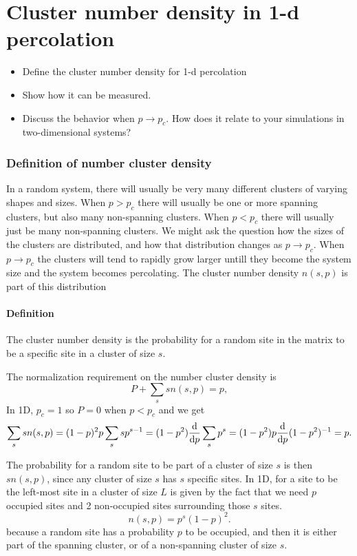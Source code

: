 \documentclass[a4paper, 11pt, notitlepage, english]{article}
\renewcommand{\d}{{\rm d}}
\begin{document}
\clearpage


\section{ Cluster number density in 1-d percolation}
\begin{itemize}
	\item Define the cluster number density for 1-d percolation
	\item Show how it can be measured.
	\item Discuss the behavior when $p \to p_c$. How does it relate to your simulations in two-dimensional systems?
\end{itemize}

\subsubsection*{Definition of number cluster density}

In a random system, there will usually be very many different clusters of varying shapes and sizes. When $p > p_c$ there will usually be one or more spanning clusters, but also many non-spanning clusters. When $p < p_c$ there will usually just be many non-spanning clusters. We might ask the question how the sizes of the clusters are distributed, and how that distribution changes as $p \to p_c$. When $p\to p_c$ the clusters will tend to rapidly grow larger untill they become the system size and the system becomes percolating. The cluster number density $n(s,p)$ is part of this distribution

\paragraph{Definition} 
The cluster number density is the probability for a random site in the matrix to be a specific site in a cluster of size $s$.

The normalization requirement on the number cluster density is
$$P + \sum_s s n(s,p) = p,$$
In 1D, $p_c = 1$ so $P = 0$ when $p<p_c$ and we get
$$\sum_s s n(s,p) = (1-p)^2 p \sum_s s p^{s-1} =  (1-p^2) \frac{\d}{\d p} \sum_s p^s = (1-p^2) p \frac{\d}{\d p} (1-p^2)^{-1} = p.$$


The probability for a random site to be part of a cluster of size $s$ is then $sn(s,p)$, since any cluster of size $s$ has $s$ specific sites. In 1D, for a site to be the left-most site in a cluster of size $L$ is given by the fact that we need $p$ occupied sites and 2 non-occupied sites surrounding those $s$ sites.
$$n(s,p) = p^s (1-p)^2.$$
because a random site has a probability $p$ to be occupied, and then it is either part of the spanning cluster, or of a non-spanning cluster of size $s$. 
\end{document}
